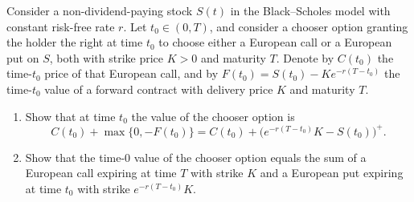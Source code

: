 \begin{problem}
    Consider a non-dividend-paying stock $S(t)$ in the Black--Scholes model with constant risk-free rate $r$. Let $t_0 \in (0, T)$, and consider a chooser option granting the holder the right at time $t_0$ to choose either a European call or a European put on $S$, both with strike price $K > 0$ and maturity $T$. Denote by $C(t_0)$ the time-$t_0$ price of that European call, and by $F(t_0) = S(t_0) - K e^{-r(T - t_0)}$ the time-$t_0$ value of a forward contract with delivery price $K$ and maturity $T$.
    \begin{enumerate}
        \item Show that at time $t_0$ the value of the chooser option is
        \[
        C(t_0) + \max\{0, -F(t_0)\} = C(t_0) + \bigl(e^{-r(T - t_0)} K - S(t_0)\bigr)^{+}.
        \]
        \item Show that the time-$0$ value of the chooser option equals the sum of a European call expiring at time $T$ with strike $K$ and a European put expiring at time $t_0$ with strike $e^{-r(T - t_0)} K$.
    \end{enumerate}
\end{problem}

